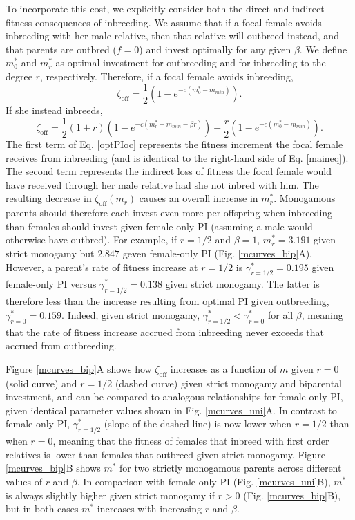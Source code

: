 \documentclass[12pt]{article}
\begin{document}
To incorporate this cost, we explicitly consider both the direct and indirect fitness consequences of inbreeding. We assume that if a focal female avoids inbreeding with her male relative, then that relative will outbreed instead, and that parents are outbred ($f=0$) and invest optimally for any given $\beta$. We define $m^{*}_{0}$ and $m^{*}_{r}$ as optimal investment for outbreeding and for inbreeding to the degree $r$, respectively. Therefore, if a focal female avoids inbreeding,
\begin{equation} \label{optPI}
\zeta_{\textrm{off}} = \frac{1}{2}\left(1-e^{-c\left(m^{*}_{0}-m_{min}\right)}\right).
\end{equation}
If she instead inbreeds,
\begin{equation} \label{optPIoc}
\zeta_{\textrm{off}} = \frac{1}{2}\left(1+r\right)\left(1-e^{-c\left(m^{*}_{r}-m_{min}-\beta r\right)}\right) - \frac{r}{2}\left(1-e^{-c\left(m^{*}_{0}-m_{min}\right)}\right).
\end{equation} 
The first term of Eq. \ref{optPIoc} represents the fitness increment the focal female receives from inbreeding (and is identical to the right-hand side of Eq. \ref{maineq}). The second term represents the indirect loss of fitness the focal female would have received through her male relative had she not inbred with him. The resulting decrease in $\zeta_{\textrm{off}}(m_{r})$ causes an overall increase in $m^{*}_{r}$. Monogamous parents should therefore each invest even more per offspring when inbreeding than females should invest given female-only PI (assuming a male would otherwise have outbred). For example, if $r=1/2$ and $\beta=1$, $m^{*}_{r}= 3.191$ given strict monogamy but $2.847$ geven female-only PI (Fig. \ref{mcurves_bip}A).  However, a parent's rate of fitness increase at $r=1/2$ is $\gamma^{*}_{r=1/2}=0.195$ given female-only PI versus $\gamma^{*}_{r=1/2}=0.138$ given strict monogamy. The latter is therefore less than the increase resulting from optimal PI given outbreeding, $\gamma^{*}_{r=0}=0.159$. Indeed, given strict monogamy, $\gamma^{*}_{r=1/2} < \gamma^{*}_{r=0}$ for all $\beta$, meaning that the rate of fitness increase accrued from inbreeding never exceeds that accrued from outbreeding. 

Figure \ref{mcurves_bip}A shows how $\zeta_{\textrm{off}}$ increases as a function of $m$ given $r=0$ (solid curve) and $r=1/2$ (dashed curve) given strict monogamy and biparental investment, and can be compared to analogous relationships for female-only PI, given identical parameter values shown in Fig. \ref{mcurves_uni}A. In contrast to female-only PI, $\gamma^{*}_{r=1/2}$ (slope of the dashed line) is now lower when $r=1/2$ than when $r=0$, meaning that the fitness of females that inbreed with first order relatives is lower than females that outbreed given strict monogamy. Figure \ref{mcurves_bip}B shows $m^{*}$ for two strictly monogamous parents across different values of $r$ and $\beta$. In comparison with female-only PI (Fig. \ref{mcurves_uni}B), $m^{*}$ is always slightly higher given strict monogamy if $r>0$ (Fig. \ref{mcurves_bip}B), but in both cases $m^{*}$ increases with increasing $r$ and $\beta$. 
\end{document}
